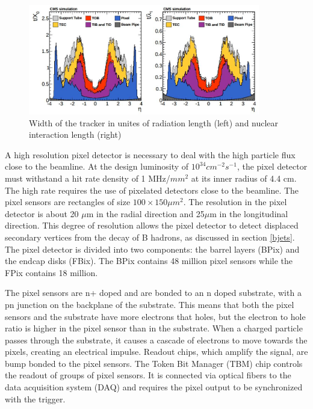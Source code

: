 \documentclass[oneside, letterpaper, oldfontcommands]{memoir}
\begin{document}
\begin{figure}[here]
\includegraphics[width=0.9\textwidth]{trackerlength.jpg}
\caption{Width of the tracker in unites of radiation length (left) and nuclear interaction length (right) \cite{Chatrchyan:2014fea}}
\label{fig:trackerlength}
\end{figure}


\qquad A high resolution pixel detector is necessary to deal with the high particle flux close to the beamline.  At the design luminosity of $10^{34} cm^{-2} s^{-1}$, the pixel detector must withstand a hit rate density of 1 MHz/$mm^{2}$ at its inner radius of 4.4 cm. The high rate requires the use of pixelated detectors close to the beamline. The pixel sensors are rectangles of size $100 \times 150 \mu m^{2}$. The resolution in the pixel detector is about 20 $\mu$m in the radial direction and 25$\mu$m in the longitudinal direction\cite{Meier:1977837}. This degree of resolution allows the pixel detector to detect displaced secondary vertices from the decay of B hadrons, as discussed in section \ref{bjets}. The pixel detector is divided into two components: the barrel layers (BPix) and the endcap disks (FBix). The BPix contains 48 million pixel sensors while the FPix contains 18 million.

\qquad The pixel sensors are n+ doped and are bonded to an n doped substrate, with a pn junction on the backplane of the substrate. This means that both the pixel sensors and the substrate have more electrons that holes, but the electron to hole ratio is higher in the pixel sensor than in the substrate. When a charged particle passes through the substrate, it causes a cascade of electrons to move towards the pixels, creating an electrical impulse. Readout chips, which amplify the signal, are bump bonded \cite{Chiochia:2007pu} to the pixel sensors. The Token Bit Manager (TBM) chip controls the readout of groups of pixel sensors. It is connected via optical fibers to the data acquisition system (DAQ) and requires the pixel output to be synchronized with the trigger.
\end{document}
